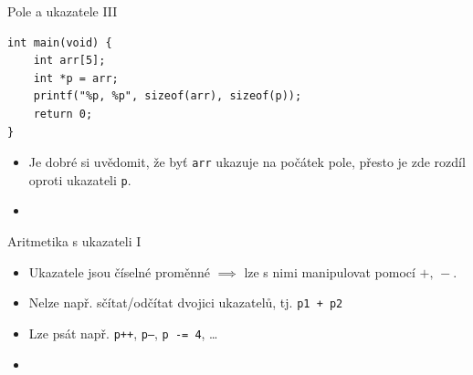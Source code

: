\documentclass[14pt,aspectratio=169]{beamer}
\begin{document}
    \begin{frame}[t,fragile]{Pole a ukazatele III}
        \begin{lstlisting}
int main(void) {
    int arr[5];
    int *p = arr;
    printf("%p, %p", sizeof(arr), sizeof(p));
    return 0;
}
        \end{lstlisting}
        \begin{itemize}
            \item Je dobré si uvědomit, že byť \texttt{arr} ukazuje na počátek pole, přesto je zde rozdíl oproti ukazateli \texttt{p}.
            \item {}
        \end{itemize}
    \end{frame}

    \begin{frame}[t]{Aritmetika s ukazateli I}
        \begin{itemize}
            \item Ukazatele jsou číselné proměnné $\implies$ lze s nimi manipulovat pomocí $+,\,-$.
            \item Nelze např. sčítat/odčítat dvojici ukazatelů, tj. \texttt{p1 + p2}
            \item Lze psát např. \texttt{p++}, \texttt{p--}, \texttt{p -= 4}, \dots
            \item {}
        \end{itemize}
    \end{frame}
\end{document}

